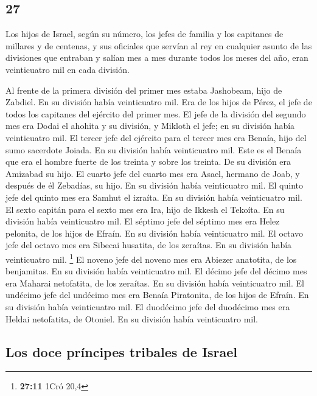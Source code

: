 \begin{paracol}{2}
\hypertarget{section-52}{%
\section{27}\label{section-52}}

 Los hijos de Israel, según su número, los jefes de
familia y los capitanes de millares y de centenas, y sus oficiales que
servían al rey en cualquier asunto de las divisiones que entraban y
salían mes a mes durante todos los meses del año, eran veinticuatro mil
en cada división.

 Al frente de la primera división del primer mes estaba
Jashobeam, hijo de Zabdiel. En su división había veinticuatro mil.
 Era de los hijos de Pérez, el jefe de todos los capitanes
del ejército del primer mes.  El jefe de la división del
segundo mes era Dodai el ahohita y su división, y Mikloth el jefe; en su
división había veinticuatro mil.  El tercer jefe del
ejército para el tercer mes era Benaía, hijo del sumo sacerdote Joiada.
En su división había veinticuatro mil.  Este es el Benaía
que era el hombre fuerte de los treinta y sobre los treinta. De su
división era Amizabad su hijo.  El cuarto jefe del cuarto
mes era Asael, hermano de Joab, y después de él Zebadías, su hijo. En su
división había veinticuatro mil.  El quinto jefe del
quinto mes era Samhut el izraíta. En su división había veinticuatro mil.
 El sexto capitán para el sexto mes era Ira, hijo de
Ikkesh el Tekoíta. En su división había veinticuatro mil.
 El séptimo jefe del séptimo mes era Helez pelonita, de
los hijos de Efraín. En su división había veinticuatro mil.
 El octavo jefe del octavo mes era Sibecai husatita, de
los zeraítas. En su división había veinticuatro mil. \footnote{\textbf{27:11}
  1Cró 20,4}  El noveno jefe del noveno mes era Abiezer
anatotita, de los benjamitas. En su división había veinticuatro mil.
 El décimo jefe del décimo mes era Maharai netofatita, de
los zeraítas. En su división había veinticuatro mil.  El
undécimo jefe del undécimo mes era Benaía Piratonita, de los hijos de
Efraín. En su división había veinticuatro mil.  El
duodécimo jefe del duodécimo mes era Heldai netofatita, de Otoniel. En
su división había veinticuatro mil.

\hypertarget{los-doce-pruxedncipes-tribales-de-israel}{%
\subsection{Los doce príncipes tribales de
Israel}\label{los-doce-pruxedncipes-tribales-de-israel}}


\end{paracol}
